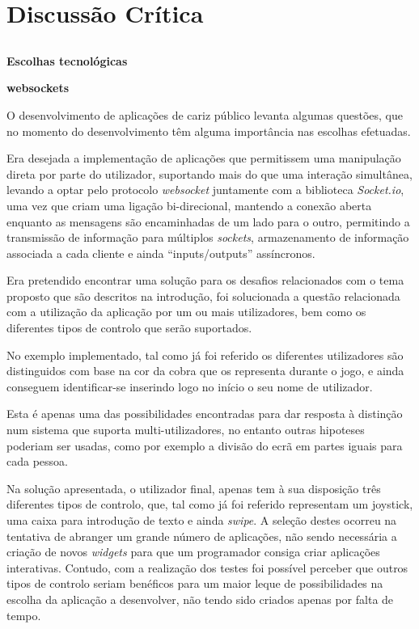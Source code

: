 \chapter{Discussão Crítica} \label{chap:disc}

\section*{}

\textbf{Escolhas tecnológicas}

\textbf{websockets}

O desenvolvimento de aplicações de cariz público levanta algumas questões, que no momento do desenvolvimento têm alguma importância nas escolhas efetuadas.

Era desejada a implementação de aplicações que permitissem uma manipulação direta por parte do utilizador, suportando mais do que uma interação simultânea, levando a optar pelo protocolo \textit{websocket} juntamente com a biblioteca \textit{Socket.io}, uma vez que criam uma ligação bi-direcional, mantendo a conexão aberta enquanto as mensagens são encaminhadas de um lado para o outro, permitindo a transmissão de informação para múltiplos \textit{sockets}, armazenamento de informação associada a cada cliente e ainda “inputs/outputs” assíncronos. 

Era pretendido encontrar uma solução para os desafios relacionados com o tema proposto que são descritos na introdução, foi solucionada a questão relacionada com a utilização da aplicação por um ou mais utilizadores, bem como os diferentes tipos de controlo que serão suportados.

No exemplo implementado, tal como já foi referido os diferentes utilizadores são distinguidos com base na cor da cobra que os representa durante o jogo, e ainda conseguem identificar-se inserindo logo no início o seu nome de utilizador. 

Esta é apenas uma das possibilidades encontradas para dar resposta à distinção num sistema que suporta multi-utilizadores, no entanto outras hipoteses poderiam ser usadas, como por exemplo a divisão do ecrã em partes iguais para cada pessoa.

Na solução apresentada, o utilizador final, apenas tem à sua disposição três diferentes tipos de controlo, que, tal como já foi referido representam um joystick, uma caixa para introdução de texto e ainda \textit{swipe}. A seleção destes ocorreu na tentativa de abranger um grande número de aplicações, não sendo necessária a criação de novos \textit{widgets} para que um programador consiga criar aplicações interativas. Contudo, com a realização dos testes foi possível perceber que outros tipos de controlo seriam benéficos para um maior leque de possibilidades na escolha da aplicação a desenvolver, não tendo sido criados apenas por falta de tempo.








